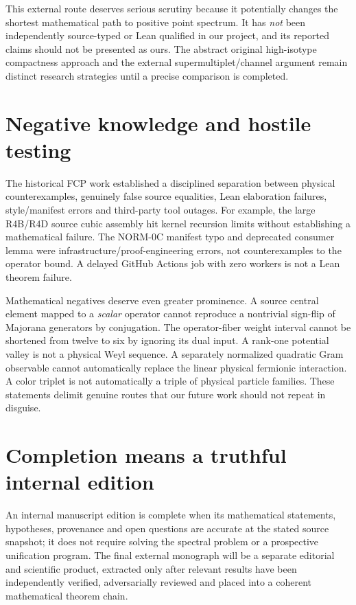 This external route deserves serious scrutiny because
it potentially changes the shortest mathematical
path to positive point spectrum. It has \emph{not}
been independently source-typed or Lean qualified in
our project, and its reported claims should not be
presented as ours. The abstract original
high-isotype compactness approach and the external
supermultiplet/channel argument remain distinct
research strategies until a precise comparison
is completed.


\section{Negative knowledge and hostile testing}
The historical FCP work established a disciplined separation between
physical counterexamples, genuinely false source equalities, Lean
elaboration failures, style/manifest errors and third-party tool
outages. For example, the large R4B/R4D source cubic assembly hit
kernel recursion limits without establishing a mathematical failure.
The NORM-0C manifest typo and deprecated consumer lemma were
infrastructure/proof-engineering errors, not counterexamples to the
operator bound. A delayed GitHub Actions job with zero workers is
not a Lean theorem failure.

Mathematical negatives deserve even greater prominence. A source
central element mapped to a \emph{scalar} operator cannot reproduce a
nontrivial sign-flip of Majorana generators by conjugation. The
operator-fiber weight interval cannot be shortened from twelve to six
by ignoring its dual input. A rank-one potential valley is not a
physical Weyl sequence. A separately normalized quadratic Gram
observable cannot automatically replace the linear physical fermionic
interaction. A color triplet is not automatically a triple of
physical particle families. These statements delimit genuine routes
that our future work should not repeat in disguise.

\section{Completion means a truthful internal edition}
An internal manuscript edition is complete when its mathematical
statements, hypotheses, provenance and open questions are accurate
at the stated source snapshot; it does not require solving the
spectral problem or a prospective unification program. The final
external monograph will be a separate editorial and scientific
product, extracted only after relevant results have been independently
verified, adversarially reviewed and placed into a coherent
mathematical theorem chain.

